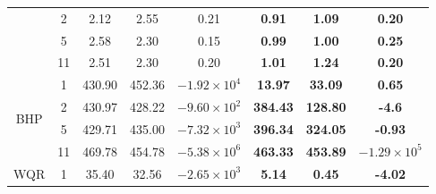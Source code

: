 \begin{table}[]
{\begin{tabular}{|c|c|ccc|ccc|}
                                  & 2                               & \multicolumn{1}{c|}{2.12}          & \multicolumn{1}{c|}{2.55}          & 0.21                  & \multicolumn{1}{c|}{\textbf{0.91}}   & \multicolumn{1}{c|}{\textbf{1.09}}   & \textbf{0.20}                  \\ \cline{2-8} 
                                  & 5                               & \multicolumn{1}{c|}{2.58}          & \multicolumn{1}{c|}{2.30}          & 0.15                  & \multicolumn{1}{c|}{\textbf{0.99}}   & \multicolumn{1}{c|}{\textbf{1.00}}   & \textbf{0.25}                  \\ \cline{2-8} 
                                  & 11                              & \multicolumn{1}{c|}{2.51}          & \multicolumn{1}{c|}{2.30}          & 0.20                  & \multicolumn{1}{c|}{\textbf{1.01}}   & \multicolumn{1}{c|}{\textbf{1.24}}   & \textbf{0.20}                  \\ \hline
\multirow{4}{*}{BHP}              & 1                               & \multicolumn{1}{c|}{430.90}        & \multicolumn{1}{c|}{452.36}        & $-1.92 \times 10^{4}$ & \multicolumn{1}{c|}{\textbf{13.97}}  & \multicolumn{1}{c|}{\textbf{33.09}}  & \textbf{0.65}                  \\ \cline{2-8} 
                                  & 2                               & \multicolumn{1}{c|}{430.97}        & \multicolumn{1}{c|}{428.22}        & $-9.60 \times 10^{2}$ & \multicolumn{1}{c|}{\textbf{384.43}} & \multicolumn{1}{c|}{\textbf{128.80}} & \textbf{-4.6}                  \\ \cline{2-8} 
                                  & 5                               & \multicolumn{1}{c|}{429.71}        & \multicolumn{1}{c|}{435.00}        & $-7.32 \times 10^{3}$ & \multicolumn{1}{c|}{\textbf{396.34}} & \multicolumn{1}{c|}{\textbf{324.05}} & \textbf{-0.93}                 \\ \cline{2-8} 
                                  & 11                              & \multicolumn{1}{c|}{469.78}        & \multicolumn{1}{c|}{454.78}        & $-5.38 \times 10^{6}$ & \multicolumn{1}{c|}{\textbf{463.33}} & \multicolumn{1}{c|}{\textbf{453.89}} & \textbf{$-1.29 \times 10^{5}$} \\ \hline
\multirow{4}{*}{WQR}              & 1                               & \multicolumn{1}{c|}{35.40}         & \multicolumn{1}{c|}{32.56}         & $-2.65 \times 10^{3}$ & \multicolumn{1}{c|}{\textbf{5.14}}   & \multicolumn{1}{c|}{\textbf{0.45}}   & \textbf{-4.02}                 \\ \cline{2-8} 

\end{tabular}}
\end{table}
